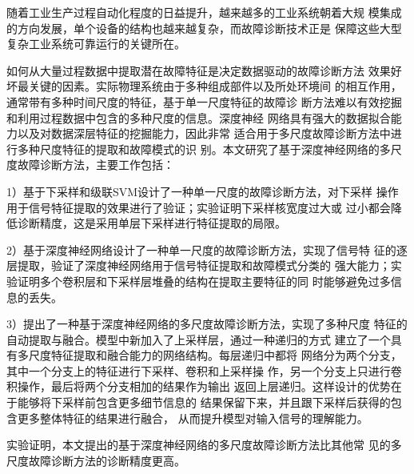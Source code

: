 \begin{cabstract}
  随着工业生产过程自动化程度的日益提升，越来越多的工业系统朝着大规
  模集成的方向发展，单个设备的结构也越来越复杂，而故障诊断技术正是
  保障这些大型复杂工业系统可靠运行的关键所在。
  
  如何从大量过程数据中提取潜在故障特征是决定数据驱动的故障诊断方法
  效果好坏最关键的因素。实际物理系统由于多种组成部件以及所处环境间
  的相互作用，通常带有多种时间尺度的特征，基于单一尺度特征的故障诊
  断方法难以有效挖掘和利用过程数据中包含的多种尺度的信息。深度神经
  网络具有强大的数据拟合能力以及对数据深层特征的挖掘能力，因此非常
  适合用于多尺度故障诊断方法中进行多种尺度特征的提取和故障模式的识
  别。本文研究了基于深度神经网络的多尺度故障诊断方法，主要工作包括：
  
  1）基于下采样和级联SVM设计了一种单一尺度的故障诊断方法，对下采样
  操作用于信号特征提取的效果进行了验证；实验证明下采样核宽度过大或
  过小都会降低诊断精度，这是采用单层下采样进行特征提取的局限。
  
  2）基于深度神经网络设计了一种单一尺度的故障诊断方法，实现了信号特
  征的逐层提取，验证了深度神经网络用于信号特征提取和故障模式分类的
  强大能力；实验证明多个卷积层和下采样层堆叠的结构在提取主要特征的同
  时能够避免过多信息的丢失。
  
  3）提出了一种基于深度神经网络的多尺度故障诊断方法，实现了多种尺度
  特征的自动提取与融合。模型中新加入了上采样层，通过一种递归的方式
  建立了一个具有多尺度特征提取和融合能力的网络结构。每层递归中都将
  网络分为两个分支，其中一个分支上的特征进行下采样、卷积和上采样操
  作，另一个分支上只进行卷积操作，最后将两个分支相加的结果作为输出
  返回上层递归。这样设计的优势在于能够将下采样前包含更多细节信息的
  结果保留下来，并且跟下采样后获得的包含更多整体特征的结果进行融合，
  从而提升模型对输入信号的理解能力。

  实验证明，本文提出的基于深度神经网络的多尺度故障诊断方法比其他常
  见的多尺度故障诊断方法的诊断精度更高。

\end{cabstract}


